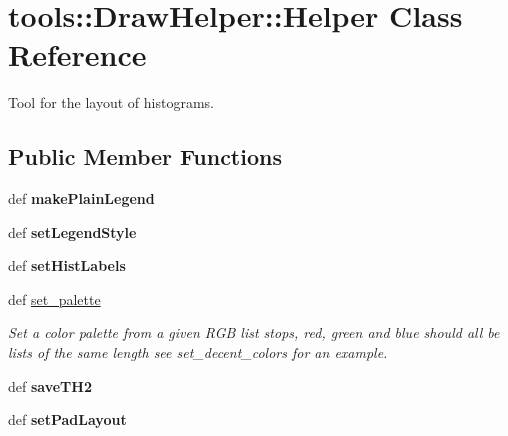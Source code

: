 \hypertarget{classtools_1_1DrawHelper_1_1Helper}{
\section{tools::DrawHelper::Helper Class Reference}
\label{classtools_1_1DrawHelper_1_1Helper}
}
Tool for the layout of histograms.  


\subsection*{Public Member Functions}
\begin{CompactItemize}
\item 
\hypertarget{classtools_1_1DrawHelper_1_1Helper_3ab13b55e5b1911cfa896211724c593e}{
def \textbf{makePlainLegend}}
\label{classtools_1_1DrawHelper_1_1Helper_3ab13b55e5b1911cfa896211724c593e}

\item 
\hypertarget{classtools_1_1DrawHelper_1_1Helper_4ae2572c9e2af0a0d3282c0fc03ad45f}{
def \textbf{setLegendStyle}}
\label{classtools_1_1DrawHelper_1_1Helper_4ae2572c9e2af0a0d3282c0fc03ad45f}

\item 
\hypertarget{classtools_1_1DrawHelper_1_1Helper_69f269b4de44e0381f80b325d63d186d}{
def \textbf{setHistLabels}}
\label{classtools_1_1DrawHelper_1_1Helper_69f269b4de44e0381f80b325d63d186d}

\item 
\hypertarget{classtools_1_1DrawHelper_1_1Helper_71502b23e9579008d297e76e9d31cf81}{
def \hyperlink{classtools_1_1DrawHelper_1_1Helper_71502b23e9579008d297e76e9d31cf81}{set\_\-palette}}
\label{classtools_1_1DrawHelper_1_1Helper_71502b23e9579008d297e76e9d31cf81}

\begin{CompactList}\small\item\em Set a color palette from a given RGB list stops, red, green and blue should all be lists of the same length see set\_\-decent\_\-colors for an example. \item\end{CompactList}\item 
\hypertarget{classtools_1_1DrawHelper_1_1Helper_2da917e5def60c8e1d04f2ef552da0f6}{
def \textbf{saveTH2}}
\label{classtools_1_1DrawHelper_1_1Helper_2da917e5def60c8e1d04f2ef552da0f6}

\item 
\hypertarget{classtools_1_1DrawHelper_1_1Helper_9bc97dd46da41417d715a757b83d3b9a}{
def \textbf{setPadLayout}}
\label{classtools_1_1DrawHelper_1_1Helper_9bc97dd46da41417d715a757b83d3b9a}


\end{CompactItemize}
